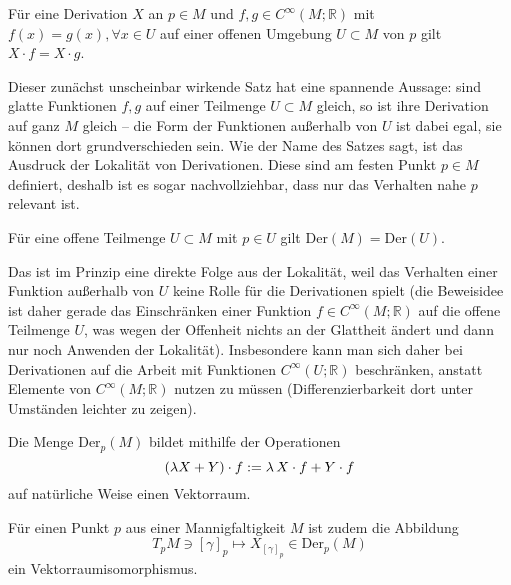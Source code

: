 \documentclass[../H_Analysis_main.tex]{subfiles}
\begin{document}
\begin{satz}[Lokalität]
Für eine Derivation $X$ an $p \in M$ und $f, g \in C^\infty(M; \mathbb{R})$ mit $f(x) = g(x), \forall x \in U$ auf einer offenen Umgebung $U \subset M$ von $p$ gilt $X \cdot f = X \cdot g$.
\end{satz}
Dieser zunächst unscheinbar wirkende Satz hat eine spannende Aussage: sind glatte Funktionen $f, g$ auf einer Teilmenge $U \subset M$ gleich, so ist ihre Derivation auf ganz $M$ gleich -- die Form der Funktionen außerhalb von $U$ ist dabei egal, sie können dort grundverschieden sein. Wie der Name des Satzes sagt, ist das Ausdruck der Lokalität von Derivationen. Diese sind am festen Punkt $p \in M$ definiert, deshalb ist es sogar nachvollziehbar, dass nur das Verhalten nahe $p$ relevant ist.


\begin{cor}
Für eine offene Teilmenge $U \subset M$ mit $p \in U$ gilt $\text{Der}(M) = \text{Der}(U)$.
\end{cor}
Das ist im Prinzip eine direkte Folge aus der Lokalität, weil das Verhalten einer Funktion außerhalb von $U$ keine Rolle für die Derivationen spielt (die Beweisidee ist daher gerade das Einschränken einer Funktion $f \in C^\infty(M; \mathbb{R})$ auf die offene Teilmenge $U$, was wegen der Offenheit nichts an der Glattheit ändert und dann nur noch Anwenden der Lokalität). Insbesondere kann man sich daher bei Derivationen auf die Arbeit mit Funktionen $C^\infty(U; \mathbb{R})$ beschränken, anstatt Elemente von $C^\infty(M; \mathbb{R})$ nutzen zu müssen (Differenzierbarkeit dort unter Umständen leichter zu zeigen).

\begin{satz}
Die Menge $\text{Der}_p(M)$ bildet mithilfe der Operationen
\begin{equation}
\qty(\lambda X + Y) \cdot f := \lambda \, X \cdot f + Y \cdot f
\end{equation}
auf natürliche Weise einen Vektorraum.

Für einen Punkt $p$ aus einer Mannigfaltigkeit $M$ ist zudem die Abbildung
\begin{equation}
T_p M \ni [\gamma]_p \mapsto X_{[\gamma]_p} \in \text{Der}_p(M)
\end{equation}
ein Vektorraumisomorphismus.
\end{satz}
\end{document}
